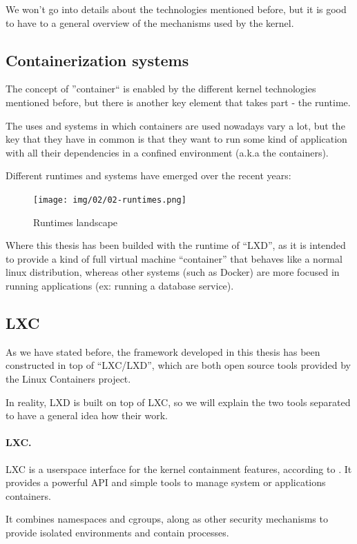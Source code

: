 We won't go into details about the technologies mentioned before, but it is good to have to a general overview of the mechanisms used by the kernel.


\bigskip
\subsection{Containerization systems}
The concept of ''container`` is enabled by the different kernel technologies mentioned before, but there is another key element that takes part - the runtime.

The uses and systems in which containers are used nowadays vary a lot, but the key that they have in common is that they want to run some kind of application with all their dependencies in a confined environment (a.k.a the containers).

Different runtimes and systems have emerged over the recent years:
\begin{figure}[H]
	\label{fig:Runtimes containers landscape}
	\centering
	\texttt{[image: img/02/02-runtimes.png]}
	\caption[Runtimes lansdcape]{\footnotesize{Runtimes landscape}}
\end{figure}

Where this thesis has been builded with the runtime of ``LXD'', as it is intended to provide a kind of full virtual machine ``container'' that behaves like a normal linux distribution, whereas other systems (such as Docker) are more focused in running applications (ex: running a database service).

\subsection{LXC}
As we have stated before, the framework developed in this thesis has been constructed in top of ``LXC/LXD'', which are both open source tools provided by the Linux Containers project.

In reality, LXD is built on top of LXC, so we will explain the two tools separated to have a general idea how their work.

\paragraph{LXC.} LXC is a userspace interface for the kernel containment features, according to \cite{lxc}. It provides a powerful API and simple tools to manage system or applications containers.

It combines namespaces and cgroups, along as other security mechanisms to provide isolated environments and contain processes.

